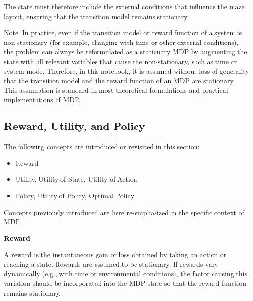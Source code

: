 \begin{mdframed}
\begin{itemize}
		The state must therefore include the external conditions that influence the maze layout, ensuring that the transition model remains stationary.
	\end{itemize}
	
Note: In practice, even if the transition model or reward function of a system is non-stationary (for example, changing with time or other external conditions), the problem can always be reformulated as a stationary MDP by augmenting the state with all relevant variables that cause the non-stationary, such as time or system mode. Therefore, in this notebook, it is assumed without loss of generality that the transition model and the reward function of an MDP are stationary. This assumption is standard in most theoretical formulations and practical implementations of MDP.

\end{mdframed}

\subsection{Reward, Utility, and Policy}

The following concepts are introduced or revisited in this section:
\begin{itemize}
	\item Reward
	\item Utility, Utility of State, Utility of Action
	\item Policy, Utility of Policy, Optimal Policy
\end{itemize}
Concepts previously introduced are here re-emphasized in the specific context of MDP.

\vspace{0.1in}
\noindent \textbf{Reward}
\vspace{0.1in}

A reward is the instantaneous gain or loss obtained by taking an action or reaching a state. Rewards are assumed to be stationary. If rewards vary dynamically (e.g., with time or environmental conditions), the factor causing this variation should be incorporated into the MDP state so that the reward function remains stationary.  


